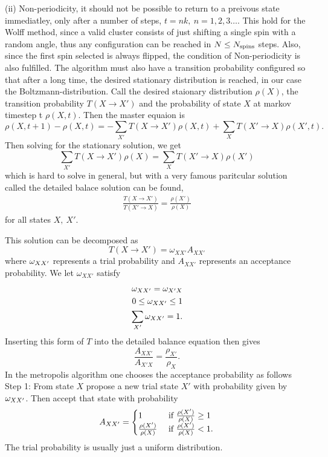 (ii) Non-periodicity, it should not be possible to return to a preivous state immediatley, only after a number of steps, $t =nk,~ n = 1,2,3\dots$.
This hold for the Wolff method, since a valid cluster consists of just shifting a single spin with a random angle, thus any configuration can be reached in $N \leq N_{\textrm{spins}}$ steps. Also, since the first spin selected is always flipped, the condition of Non-periodicity is also fulfilled.
The algorithm must also have a transition probability configured so that after a long time, the desired stationary distribution is reached, in our case the Boltzmann-distribution.
Call the desired staionary distribution $\rho(X)$, the transition probability $T(X \rightarrow X')$ and the probability of state $X$ at markov timestep t $\rho(X,t)$.
Then the master equaion is 
\begin{equation}
  \rho(X, t+1) - \rho(X,t) = -\sum_{X'} T(X\rightarrow X')\rho(X,t) +\sum_{X} T(X'\rightarrow X)\rho(X',t).
\end{equation}
Then solving for the stationary solution, we get
\begin{equation}
  \sum_{X'}T(X\rightarrow X') \rho(X) =  \sum_{X}T(X'\rightarrow X) \rho(X')
\end{equation}
which is hard to solve in general, but with a very famous paritcular solution called the detailed balace solution can be found,
\begin{align}
  \frac{T(X\rightarrow X')}{T(X'\rightarrow X)} = \frac{\rho(X')}{\rho(X)} 
  \label{eq:detbal}
\end{align}
for all states $X,~X'$.

This solution can be decomposed as
\begin{equation}
  T(X\rightarrow X') = \omega_{XX'} A_{XX'}
\end{equation}
where $\omega_{XX'}$ represents a trial probability and $A_{XX'}$ represents an acceptance probability.
We let $\omega_{XX'}$ satisfy
\begin{align}
  \omega_{XX'} = \omega_{X'X}\\
  0 \leq \omega_{XX'} \leq 1\\
  \sum_{X'} \omega_{XX'} = 1.
\end{align}
Inserting this form of $T$ into the detailed balance equation then gives
\begin{equation}
  \frac{A_{XX'}}{A_{X'X}} = \frac{\rho_{X'}}{\rho_{X}}.
\end{equation}
In the metropolis algorithm one chooses the acceptance probability as follows
Step 1: From state $X$ propose a new trial state $X'$ with probability given by $\omega_{XX'}$. Then accept that state with probability 
\begin{equation}
  A_{XX'} = 
  \begin{cases}
    	1 &\textrm{ if } \frac{\rho(X')}{\rho(X)} \geq 1\\
	\frac{\rho(X')}{\rho(X)}&\textrm{ if } \frac{\rho(X')}{\rho(X)} < 1 .
  \end{cases}
\end{equation}
The trial probability is usually just a uniform distribution.
